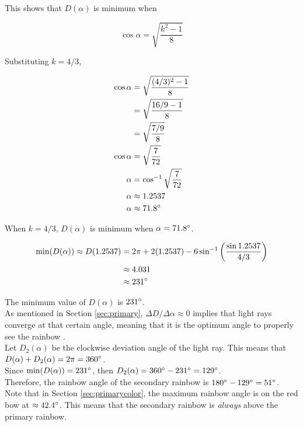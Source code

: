 \documentclass[a4paper,12pt]{article}
\begin{document}
This shows that $D(\alpha)$ is minimum when 

\begin{equation} \label{eq:cossec}
\cos \alpha = \sqrt{\frac{k^2-1}{8}}
\end{equation}

Substituting $k = 4/3$,

\begin{align*}
\cos \alpha &= \sqrt{\frac{(4/3)^2-1}{8}}\\
&= \sqrt{\frac{16/9-1}{8}}\\
&= \sqrt{\frac{7/9}{8}}\\
\cos \alpha &= \sqrt{\frac{7}{72}}\\
\alpha &= \cos^{-1} \sqrt{\frac{7}{72}}\\
\alpha &\approx 1.2537\\
\alpha &\approx 71.8 \degree\\
\end{align*}

When $k=4/3$, $D(\alpha)$ is minimum when $\alpha = 71.8 \degree$.

\begin{align*}
\min(D(\alpha)) \approx D(1.2537) &= 2\pi + 2(1.2537) - 6 \sin^{-1} \left( \frac{\sin 1.2537}{4/3} \right)\\
&\approx 4.031\\
&\approx 231 \degree\\
\end{align*}

The minimum value of $D(\alpha)$ is $231\degree$.\\

As mentioned in Section \ref{sec:primary}, $\Delta D/ \Delta \alpha \approx 0$ implies that light rays converge at that certain angle, meaning that it is the optimum angle to properly see the rainbow \cite[219]{stewart21}.\\

Let $D_2(\alpha)$ be the clockwise deviation angle of the light ray. This means that $D(\alpha) + D_2(\alpha) = 2\pi = 360\degree$.\\

Since $\min(D(\alpha)) = 231\degree$, then $D_2(\alpha) = 360\degree - 231\degree = 129 \degree$.\\

Therefore, the rainbow angle of the secondary rainbow is $180 \degree - 129\degree = 51\degree$. Note that in Section \ref{sec:primarycolor}, the maximum rainbow angle is on the red bow at $\approx 42.4 \degree$. This means that the secondary rainbow is {\itshape always} above the primary rainbow.
\end{document}
